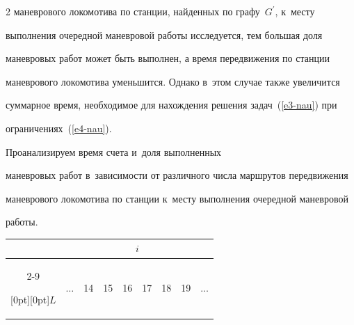 \begin{multicols}{2}
маневрового локомотива по станции, найденных по графу~$G^\prime$, к~месту 


выполнения очередной маневровой работы исследуется, тем большая доля 


маневровых работ может быть выполнен, а время передвижения по станции 


маневрового локомотива уменьшится. Однако в~этом случае также увеличится 


суммарное время, необходимое для нахождения решения задач~(\ref{e3-nau}) при 


ограничениях~(\ref{e4-nau}). 







Проанализируем время счета и~доля выполненных 


маневровых работ в~зависимости от различного числа маршрутов передвижения 


маневрового локомотива по станции к~месту выполнения очередной маневровой 


работы.


      


\begin{table}\small %


 \begin{center}


 \parbox{320pt}{





}





\vspace*{2ex}


       


\begin{tabular}{|c|c|c|c|c|c|c|c|c|}


\hline


&\multicolumn{8}{c|}{$i$}\\


\cline{2-9}


\raisebox{6pt}[0pt][0pt]{$L$}&$\ldots$&14&15&16&17&18&19&$\ldots$\\


\hline



\end{tabular}
\end{center}
\end{table}
\end{multicols}
